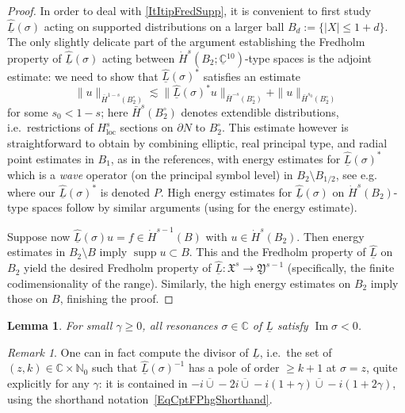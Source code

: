\documentclass[reqno,11pt,letterpaper]{amsart}
\numberwithin{equation}{section}
\numberwithin{figure}{section}
\newtheorem{lemma}[thm]{Lemma}
\theoremstyle{definition}
\theoremstyle{remark}
\newtheorem{rmk}[thm]{Remark}
\newcommand{\C}{\mathbb{C}}
\newcommand{\N}{\mathbb{N}}
\newcommand{\fX}{\mathfrak{X}}
\newcommand{\fY}{\mathfrak{Y}}
\renewcommand{\Im}{\operatorname{Im}}
\newcommand{\supp}{\operatorname{supp}}
\newcommand{\extcup}{\operatorname{\ol\cup}}
\newcommand{\ol}{\overline}
\newcommand{\pa}{\partial}
\newcommand{\ul}[1]{\underline{#1}{}}
\newcommand{\wh}{\widehat}
\newcommand{\loc}{{\mathrm{loc}}}
\newcommand{\Hloc}{H_{\loc}}
\newcommand{\Hext}{\bar H}
\newcommand{\Hsupp}{\dot H}
\begin{document}
\begin{proof}
  In order to deal with \eqref{ItItipFredSupp}, it is convenient to first study $\wh{\ul L}(\sigma)$ acting on supported distributions on a larger ball $B_d:=\{|X|\leq 1+d\}$. The only slightly delicate part of the argument establishing the Fredholm property of $\wh{\ul L}(\sigma)$ acting between $\Hsupp^s(B_2;\ul\C^{10})$-type spaces is the adjoint estimate: we need to show that $\wh{\ul L}(\sigma)^*$ satisfies an estimate
  \begin{equation}
  \label{EqItipFredAdjoint}
    \|u\|_{\Hext^{1-s}(B_2^\circ)}\lesssim \|\wh{\ul L}(\sigma)^*u\|_{\Hext^{-s}(B_2^\circ)}+\|u\|_{\Hext^{s_0}(B_2^\circ)}
  \end{equation}
  for some $s_0<1-s$; here $\Hext^s(B_2^\circ)$ denotes extendible distributions, i.e.\ restrictions of $\Hloc^s$ sections on $\pa N$ to $B_2^\circ$. This estimate however is straightforward to obtain by combining elliptic, real principal type, and radial point estimates in $B_1$, as in the references, with energy estimates for $\wh{\ul L}(\sigma)^*$ which is a \emph{wave} operator (on the principal symbol level) in $B_2\setminus B_{1/2}$, see e.g.\ \cite[\S3.2]{ZworskiRevisitVasy} where our $\wh{\ul L}(\sigma)^*$ is denoted $P$. High energy estimates for $\wh{\ul L}(\sigma)$ on $\Hsupp^s(B_2)$-type spaces follow by similar arguments (using \cite[Proposition~3.8]{VasyMicroKerrdS} for the energy estimate).

  Suppose now $\wh{\ul L}(\sigma)u=f\in\Hsupp^{s-1}(B)$ with $u\in\Hsupp^s(B_2)$. Then energy estimates in $B_2\setminus B$ imply $\supp u\subset B$. This and the Fredholm property of $\wh{\ul L}$ on $B_2$ yield the desired Fredholm property of $\wh{\ul L}\colon\fX^s\to\fY^{s-1}$ (specifically, the finite codimensionality of the range). Similarly, the high energy estimates on $B_2$ imply those on $B$, finishing the proof.
\end{proof}

\begin{lemma}
\label{LemmaItipResQual}
  For small $\gamma\geq 0$, all resonances $\sigma\in\C$ of $\ul L$ satisfy $\Im\sigma<0$.
\end{lemma}

\begin{rmk}
\label{RmkItipDivisor}
  One can in fact compute the divisor of $\ul L$, i.e.\ the set of $(z,k)\in\C\times\N_0$ such that $\wh{\ul L}(\sigma)^{-1}$ has a pole of order $\geq k+1$ at $\sigma=z$, quite explicitly for any $\gamma$: it is contained in $-i \extcup -2 i \extcup -i(1+\gamma) \extcup -i(1+2\gamma)$, using the shorthand notation~\eqref{EqCptFPhgShorthand}.
\end{rmk}
\end{document}
